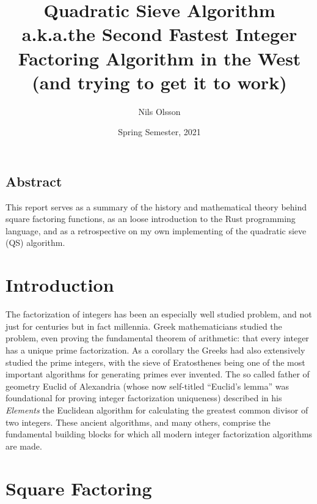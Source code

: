 \documentclass{report}
\begin{document}
\title{%
    Quadratic Sieve Algorithm \\[1em]
    {\large%
        a.k.a.\@ the Second Fastest Integer Factoring Algorithm in the West \\
        (and trying to get it to work)
    }
}
\author{Nils Olsson}
\date{Spring Semester, 2021}
\maketitle

{
\hypersetup{
    linkcolor=.,
    linkbordercolor=red,
}
\tableofcontents
}


\pagebreak

\begingroup
\let\clearpage\relax
\section*{Abstract}

This report serves as a summary of the history and mathematical theory behind
square factoring functions, as an loose introduction to the Rust programming
language, and as a retrospective on my own implementing of the quadratic sieve
(QS) algorithm.

\chapter{Introduction}

The factorization of integers has been an especially well studied problem,
and not just for centuries but in fact millennia.
Greek mathematicians studied the problem, even proving the fundamental theorem
of arithmetic: that every integer has a unique prime factorization.
As a corollary the Greeks had also extensively studied the prime integers,
with the sieve of Eratosthenes being one of the most important algorithms
for generating primes ever invented.
The so called father of geometry Euclid of Alexandria (whose now self-titled
``Euclid's lemma'' was foundational for proving integer factorization
uniqueness) described in his \emph{Elements} the Euclidean algorithm for
calculating the greatest common divisor of two integers.
These ancient algorithms, and many others, comprise the fundamental building
blocks for which all modern integer factorization algorithms are made.

\endgroup

\chapter{Square Factoring}
\end{document}
